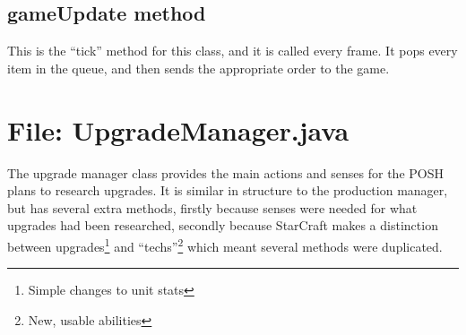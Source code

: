 \documentclass[11pt,openright,a4paper]{report}
\begin{document}
\subsection{gameUpdate method}
This is the ``tick'' method for this class, and it is called every frame. It pops every item in the queue, and then sends the appropriate order to the game.


\section{File: UpgradeManager.java}
The upgrade manager class provides the main actions and senses for the POSH plans to research upgrades. It is similar in structure to the production manager, but has several extra methods, firstly because senses were needed for what upgrades had been researched, secondly because StarCraft makes a distinction between upgrades\footnote{Simple changes to unit stats} and ``techs''\footnote{New, usable abilities} which meant several methods were duplicated.

\end{document}
